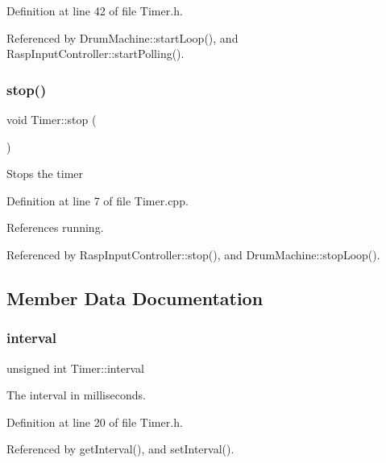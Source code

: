 Definition at line 42 of file Timer.\+h.



Referenced by Drum\+Machine\+::start\+Loop(), and Rasp\+Input\+Controller\+::start\+Polling().

\mbox{\label{class_timer_a63f0eb44b27402196590a03781515dba}} 
\subsubsection{\texorpdfstring{stop()}{stop()}}
{\footnotesize\ttfamily void Timer\+::stop (\begin{DoxyParamCaption}{ }\end{DoxyParamCaption})}

Stops the timer 

Definition at line 7 of file Timer.\+cpp.



References running.



Referenced by Rasp\+Input\+Controller\+::stop(), and Drum\+Machine\+::stop\+Loop().



\subsection{Member Data Documentation}
\mbox{\label{class_timer_aaf9bce1286b714658a0f4484d8fee960}} 
\subsubsection{\texorpdfstring{interval}{interval}}
{\footnotesize\ttfamily unsigned int Timer\+::interval\hspace{0.3cm}{\ttfamily [private]}}



The interval in milliseconds. 



Definition at line 20 of file Timer.\+h.



Referenced by get\+Interval(), and set\+Interval().

\mbox{\label{class_timer_a3d1026dd88596a97cb6b768f475ed57f}} 
